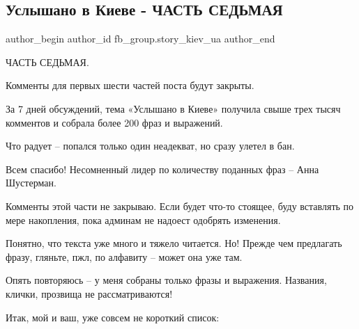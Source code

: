  
 
 
 
 
 
\subsection{Услышано в Киеве - ЧАСТЬ СЕДЬМАЯ}
\label{sec:26_07_2021.fb.fb_group.story_kiev_ua.1.uslyshano_v_kieve_7}
 
\ifcmt
 author_begin
   author_id fb_group.story_kiev_ua
 author_end
\fi

ЧАСТЬ СЕДЬМАЯ.

Комменты для первых шести частей поста будут закрыты.

За 7 дней обсуждений, тема «Услышано в Киеве» получила свыше трех тысяч
комментов и собрала более 200 фраз и выражений.

Что радует – попался только один неадекват, но сразу улетел в бан.

Всем спасибо! Несомненный лидер по количеству поданных фраз – Анна Шустерман.

Комменты этой части не закрываю. Если будет что-то стоящее, буду вставлять по
мере накопления, пока админам не надоест одобрять изменения.

Понятно, что текста уже много и тяжело читается. Но! Прежде чем предлагать
фразу, гляньте, пжл, по алфавиту – может она уже там.

Опять повторяюсь – у меня собраны только фразы и выражения. Названия, клички,
прозвища не рассматриваются!

Итак, мой и ваш, уже совсем не короткий список:

